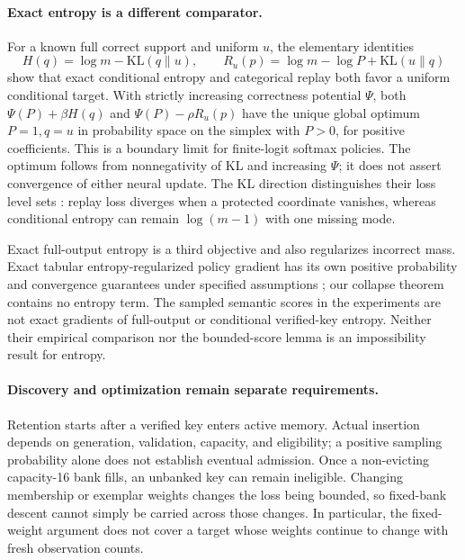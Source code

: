 \documentclass{article}
\newcommand{\1}{\mathbf 1}
\theoremstyle{remark}
\theoremstyle{definition}
\theoremstyle{plain}
\begin{document}
\paragraph{Exact entropy is a different comparator.}
For a known full correct support and uniform $u$, the elementary identities
\[
 H(q)=\log m-\mathrm{KL}(q\|u),\qquad
 R_u(p)=\log m-\log P+\mathrm{KL}(u\|q)
\]
show that exact conditional entropy and categorical replay both favor a
uniform conditional target. With strictly increasing correctness potential
$\Psi$, both $\Psi(P)+\beta H(q)$ and $\Psi(P)-\rho R_u(p)$ have the unique
global optimum $P=1,q=u$ in probability space on the simplex with $P>0$,
for positive coefficients. This is a boundary limit for finite-logit softmax
policies. The optimum follows from nonnegativity of KL and increasing
$\Psi$; it does not assert convergence of either neural update. The KL direction distinguishes their
loss level sets \citep{pereyra2017confidencepenalty,agarwal2021policygradient}:
replay loss diverges when a protected coordinate vanishes, whereas
conditional entropy can remain $\log(m-1)$ with one missing mode.

Exact full-output entropy is a third objective and also regularizes incorrect
mass. Exact tabular entropy-regularized policy gradient has its own positive
probability and convergence guarantees under specified assumptions
\citep{mei2020softmaxpg}; our collapse theorem contains no entropy term.
The sampled semantic scores in the experiments are not exact gradients of
full-output or conditional verified-key entropy. Neither their empirical
comparison nor the bounded-score lemma is an impossibility result for entropy.

\paragraph{Discovery and optimization remain separate requirements.}
Retention starts after a verified key enters active memory. Actual insertion
depends on generation, validation, capacity, and eligibility; a positive
sampling probability alone does not establish eventual admission. Once a
non-evicting capacity-16 bank fills, an unbanked key can remain ineligible.
Changing membership or exemplar weights changes the loss being bounded, so
fixed-bank descent cannot simply be carried across those changes. In
particular, the fixed-weight argument does not cover a target whose weights
continue to change with fresh observation counts.
\end{document}
